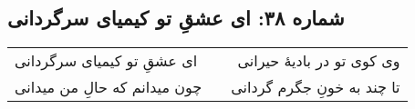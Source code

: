 \begin{center}
\section*{شماره ۳۸: ای عشقِ تو کیمیای سرگردانی}
\label{sec:038}
\begin{longtable}{l p{0.5cm} r}
ای عشقِ تو کیمیای سرگردانی
&&
وی کوی تو در بادیهٔ حیرانی
\\
چون میدانم که حالِ من میدانی
&&
تا چند به خونِ جگرم گردانی
\\
\end{longtable}
\end{center}
